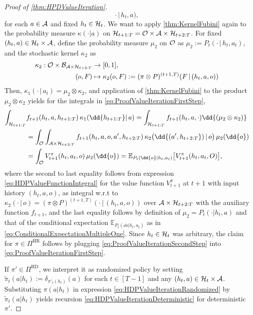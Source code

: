 \documentclass[
    a4paper,
    11pt,
    bibliography=totoc,
    listof=totoc,      
    headinclude=true,
    cleardoublepage=empty,
]{scrbook}
\theoremstyle{plain}
\theoremstyle{definition}
\theoremstyle{remark}
\newcommand{\E}{\mathbb E}
\newcommand{\SpaceA}{{\cal A}}
\newcommand{\SpaceO}{{\cal O}}
\newcommand{\SpaceH}{{\cal H}}
\begin{document}
\begin{proof}[Proof of \cref{thm:HPDValueIteration}]
\[            \cdot\,|\, h_t,a),
    \]
    for each $a\in\SpaceA$ and fixed $h_t\in\SpaceH_t$. We want to apply 
    \cref{thm:KernelFubini} again to the probability measure $\kappa(\cdot|a)$ 
    on $\SpaceH_{t+1:T} = \SpaceO\times \SpaceA\times \SpaceH_{t+2:T}$.
    For fixed $(h_t,a)\in\SpaceH_t \times\SpaceA$, define the probability 
    measure $\mu_2$ on $\SpaceO$ as $\mu_2 := P_t(\cdot\,|\, h_t, a_t)$, and 
    the stochastic kernel $\kappa_2$ as
    \begin{align*}
        \kappa_2: 
        \SpaceO \times \mathcal{B}_{\SpaceA\times\SpaceH_{t+2:T}} 
            &\to [0,1], \\
        (o, F) &\mapsto \kappa_2(o,F) 
            := (\pi\otimes P)^{(t+1,T)}(F\,|\,(h_t, a, o))
    \end{align*}
    Then, $\kappa_1(\cdot\,|\,a_t) = \mu_2 \otimes \kappa_2$, and
    application of \cref{thm:KernelFubini} to the product $\mu_2 \otimes 
    \kappa_2$ yields for the integrals in 
    \eqref{eq:ProofValueIterationFirstStep},
    \begin{align}
        \int_{\SpaceH_{t+1:T}} & f_{t+1}(h_t, a, h_{t+1:T}) \,
            \kappa_1(\dd{h_{t+1:T}} |\, a) 
        = \int_{\SpaceH_{t+1:T}} f_{t+1}(h_t, a, \cdot)
            \dd{(\mu_2 \otimes \kappa_2)} 
        \nonumber \\
        &= \int_\SpaceO \int_{\SpaceA\times\SpaceH_{t+2:T}}
                f_{t+1}(h_t,a,o,a',h_{t+2:T}) \,
                    \kappa_2\bigl(\dd{(a',h_{t+2:T}})\,|\,o\bigr) \,
                        \mu_2(\dd{o})
        \nonumber \\                        
        &= \int_\SpaceO V_{t+1}^\pi(h_t,a_t,o) \, \mu_2(\dd{o}) 
        = \E_{P_t(\dd{o}|h_t,a_t)} \bigl[ 
                V_{t+1}^\pi(h_t, a_t , O)
            \bigr],
        \label{eq:ProofValueIterationSecondStep}
    \end{align}
    where the second to last equality follows from expression
    \eqref{eq:HDPValueFunctionIntegral} for the value
    function $V_{t+1}^\pi$ at $t+1$ with input history $(h_t,a,o)$, 
    as integral w.r.t to $\kappa_2(\cdot\,|\,o) = (\pi\otimes P)^{(t+1,T)}
    (\cdot\,|\,(h_t, a,o))$ over $\SpaceA\times\SpaceH_{t+2:T}$ with the 
    auxiliary function $f_{t+1}$, and the last equality follows by definition 
    of $\mu_2=P_t(\cdot|h_t,a)$ and that of the conditional expectation 
    $\E_{P_t(\dd{o}| h_t, a_t)}$ as in 
    \cref{eq:ConditionalExpectationMultipleOne}. Since $h_t\in\SpaceH_t$ was 
    arbitrary, the claim for $\pi\in\Pi^\text{HR}$ follows by plugging 
    \eqref{eq:ProofValueIterationSecondStep} into 
    \eqref{eq:ProofValueIterationFirstStep}.
    
    If $\pi'\in\Pi^{\text{HD}}$, we interpret it as randomized policy by 
    setting $\tilde\pi_t(a|h_t) := \delta_{\pi'_t(h_t)}(a)$ for each 
    $t\in[T-1]$ and any $(h_t,a)\in \SpaceH_t\times\SpaceA$. Substituting 
    $\pi(a|h_t)$ in expression \eqref{eq:HDPValueIterationRandomized} by 
    $\tilde\pi_t(a|h_t)$ yields recursion 
    \eqref{eq:HDPValueIterationDeterministic} for deterministic $\pi'$.    
\end{proof}
\end{document}
